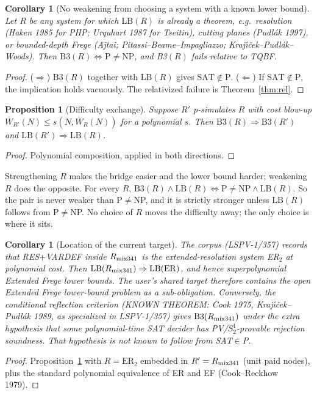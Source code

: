 \documentclass[11pt]{article}
\newtheorem{corollary}[theorem]{Corollary}
\newtheorem{proposition}[theorem]{Proposition}
\newcommand{\Wb}{\overline W}
\begin{document}
\begin{corollary}[No weakening from choosing a system with a known lower bound]\label{cor:known}
Let $R$ be any system for which $\mathrm{LB}(R)$ is already a theorem, e.g.\ resolution (Haken 1985 for PHP; Urquhart 1987 for Tseitin), cutting planes (Pudl\'ak 1997), or bounded-depth Frege (Ajtai; Pitassi--Beame--Impagliazzo; Kraj\'{\i}\v{c}ek--Pudl\'ak--Woods). Then $\mathrm{B3}(R)\Longleftrightarrow \mathrm P\neq\mathrm{NP}$, and B3$(R)$ fails relative to TQBF.
\end{corollary}
\begin{proof}
($\Rightarrow$) $\mathrm{B3}(R)$ together with $\mathrm{LB}(R)$ gives $\mathrm{SAT}\notin\mathrm P$. ($\Leftarrow$) If $\mathrm{SAT}\notin\mathrm P$, the implication holds vacuously. The relativized failure is Theorem~\ref{thm:rel}.
\end{proof}

\begin{proposition}[Difficulty exchange]\label{prop:exchange}
Suppose $R'$ p-simulates $R$ with cost blow-up $\Wb_{R'}(N)\le s(N,\Wb_R(N))$ for a polynomial $s$. Then $\mathrm{B3}(R)\Rightarrow\mathrm{B3}(R')$ and $\mathrm{LB}(R')\Rightarrow\mathrm{LB}(R)$.
\end{proposition}
\begin{proof}
Polynomial composition, applied in both directions.
\end{proof}
\noindent Strengthening $R$ makes the bridge easier and the lower bound harder; weakening $R$ does the opposite. For every $R$, $\mathrm{B3}(R)\wedge\mathrm{LB}(R)\Longleftrightarrow \mathrm P\neq\mathrm{NP}\wedge\mathrm{LB}(R)$. So the pair is never weaker than P$\neq$NP, and it is strictly stronger unless $\mathrm{LB}(R)$ follows from P$\neq$NP. No choice of $R$ moves the difficulty away; the only choice is where it sits.

\begin{corollary}[Location of the current target]\label{cor:ef}
The corpus (LSPV-1/357) records that RES$+$VARDEF inside $R_{\rm mix341}$ is the extended-resolution system ER$_2$ at polynomial cost. Then $\mathrm{LB}(R_{\rm mix341})\Rightarrow\mathrm{LB}(\mathrm{ER})$, and hence superpolynomial Extended Frege lower bounds. The user's shared target therefore contains the open Extended Frege lower-bound problem as a sub-obligation. Conversely, the conditional reflection criterion (KNOWN THEOREM: Cook 1975, Kraj\'{\i}\v{c}ek--Pudl\'ak 1989, as specialized in LSPV-1/357) gives $\mathrm{B3}(R_{\rm mix341})$ under the extra hypothesis that some polynomial-time SAT decider has PV/$S^1_2$-provable rejection soundness. That hypothesis is not known to follow from SAT$\in$P.
\end{corollary}
\begin{proof}
Proposition~\ref{prop:exchange} with $R=\mathrm{ER}_2$ embedded in $R'=R_{\rm mix341}$ (unit paid nodes), plus the standard polynomial equivalence of ER and EF (Cook--Reckhow 1979).
\end{proof}
\end{document}
